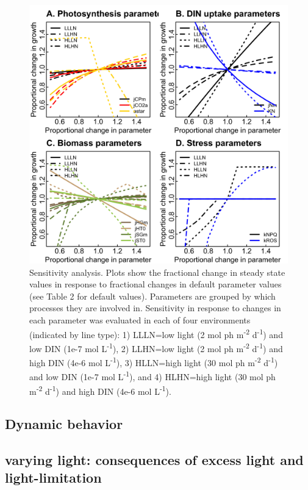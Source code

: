 \documentclass[]{elsarticle} %
\makeatletter
\def\maxwidth{\ifdim\Gin@nat@width>\linewidth\linewidth
\else\Gin@nat@width\fi}
\let\Oldincludegraphics\includegraphics
\renewcommand{\includegraphics}[1]{\Oldincludegraphics[width=\maxwidth]{#1}}
\makeatother
\begin{document}
\begin{figure}[htbp]
\centering
\includegraphics{../img/Fig3.png}
\caption{Sensitivity analysis. Plots show the fractional change in
steady state values in response to fractional changes in default
parameter values (see Table 2 for default values). Parameters are
grouped by which processes they are involved in. Sensitivity in response
to changes in each parameter was evaluated in each of four environments
(indicated by line type): 1) LLLN=low light (2 mol ph
m\textsuperscript{-2} d\textsuperscript{-1}) and low DIN (1e-7 mol
L\textsuperscript{-1}), 2) LLHN=low light (2 mol ph
m\textsuperscript{-2} d\textsuperscript{-1}) and high DIN (4e-6 mol
L\textsuperscript{-1}), 3) HLLN=high light (30 mol ph
m\textsuperscript{-2} d\textsuperscript{-1}) and low DIN (1e-7 mol
L\textsuperscript{-1}), and 4) HLHN=high light (30 mol ph
m\textsuperscript{-2} d\textsuperscript{-1}) and high DIN (4e-6 mol
L\textsuperscript{-1}).}
\end{figure}

\subsection{Dynamic behavior}\label{dynamic-behavior}

\subsection{varying light: consequences of excess light and
light-limitation}\label{varying-light-consequences-of-excess-light-and-light-limitation}
\end{document}
